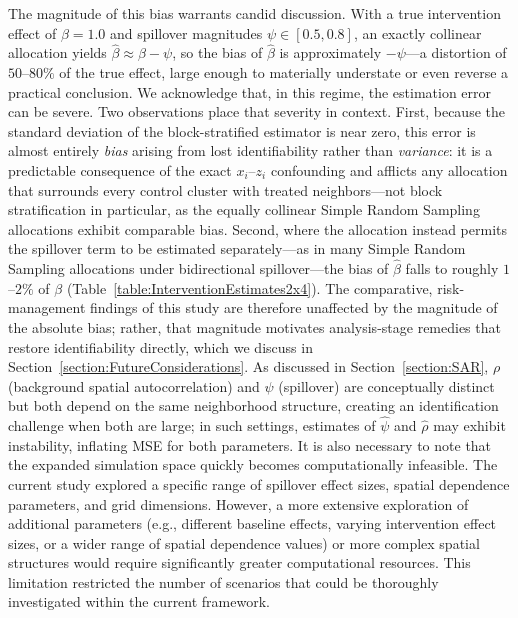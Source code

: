 \documentclass{article}[11pt]
\begin{document}
The magnitude of this bias warrants candid discussion. With a true intervention effect of $\beta = 1.0$ and spillover magnitudes $\psi \in [0.5, 0.8]$, an exactly collinear allocation yields $\hat{\beta} \approx \beta - \psi$, so the bias of $\hat{\beta}$ is approximately $-\psi$---a distortion of $50$--$80\%$ of the true effect, large enough to materially understate or even reverse a practical conclusion. We acknowledge that, in this regime, the estimation error can be severe. Two observations place that severity in context. First, because the standard deviation of the block-stratified estimator is near zero, this error is almost entirely \emph{bias} arising from lost identifiability rather than \emph{variance}: it is a predictable consequence of the exact $x_i$--$z_i$ confounding and afflicts any allocation that surrounds every control cluster with treated neighbors---not block stratification in particular, as the equally collinear Simple Random Sampling allocations exhibit comparable bias. Second, where the allocation instead permits the spillover term to be estimated separately---as in many Simple Random Sampling allocations under bidirectional spillover---the bias of $\hat{\beta}$ falls to roughly $1$--$2\%$ of $\beta$ (Table~\ref{table:InterventionEstimates2x4}). The comparative, risk-management findings of this study are therefore unaffected by the magnitude of the absolute bias; rather, that magnitude motivates analysis-stage remedies that restore identifiability directly, which we discuss in Section~\ref{section:FutureConsiderations}. As discussed in Section~\ref{section:SAR}, $\rho$ (background spatial autocorrelation) and $\psi$ (spillover) are conceptually distinct but both depend on the same neighborhood structure, creating an identification challenge when both are large; in such settings, estimates of $\hat{\psi}$ and $\hat{\rho}$ may exhibit instability, inflating MSE for both parameters. It is also necessary to note that the expanded simulation space quickly becomes computationally infeasible. The current study explored a specific range of spillover effect sizes, spatial dependence parameters, and grid dimensions. However, a more extensive exploration of additional parameters (e.g., different baseline effects, varying intervention effect sizes, or a wider range of spatial dependence values) or more complex spatial structures would require significantly greater computational resources. This limitation restricted the number of scenarios that could be thoroughly investigated within the current framework.
\end{document}
